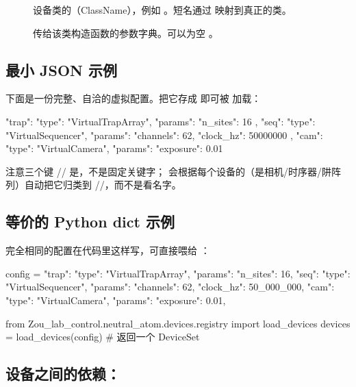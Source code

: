 \documentclass[11pt,oneside,openany]{book}
\begin{document}
\begin{description}
\item[] 设备类的（ClassName），例如 。短名通过  映射到真正的类。
\item[] 传给该类构造函数的参数字典。可以为空 \pyapi{\{\}}。
\end{description}

\subsection{最小 JSON 示例}

下面是一份完整、自洽的虚拟配置。把它存成  即可被  加载：

\begin{codeblock}[Python]
{
  "trap": {
    "type": "VirtualTrapArray",
    "params": { "n_sites": 16 }
  },
  "seq": {
    "type": "VirtualSequencer",
    "params": { "channels": 62, "clock_hz": 50000000 }
  },
  "cam": {
    "type": "VirtualCamera",
    "params": { "exposure": 0.01 }
  }
}
\end{codeblock}

注意三个键 // 是，不是固定关键字； 会根据每个设备的（是相机/时序器/阱阵列）自动把它归类到 //，而不是看名字。

\subsection{等价的 Python dict 示例}

完全相同的配置在代码里这样写，可直接喂给 ：

\begin{codeblock}[Python]
config = {
    "trap": {"type": "VirtualTrapArray", "params": {"n_sites": 16}},
    "seq":  {"type": "VirtualSequencer", "params": {"channels": 62,
                                                    "clock_hz": 50_000_000}},
    "cam":  {"type": "VirtualCamera",    "params": {"exposure": 0.01}},
}

from Zou_lab_control.neutral_atom.devices.registry import load_devices
devices = load_devices(config)   # 返回一个 DeviceSet
\end{codeblock}

\subsection{设备之间的依赖：}
\end{document}
